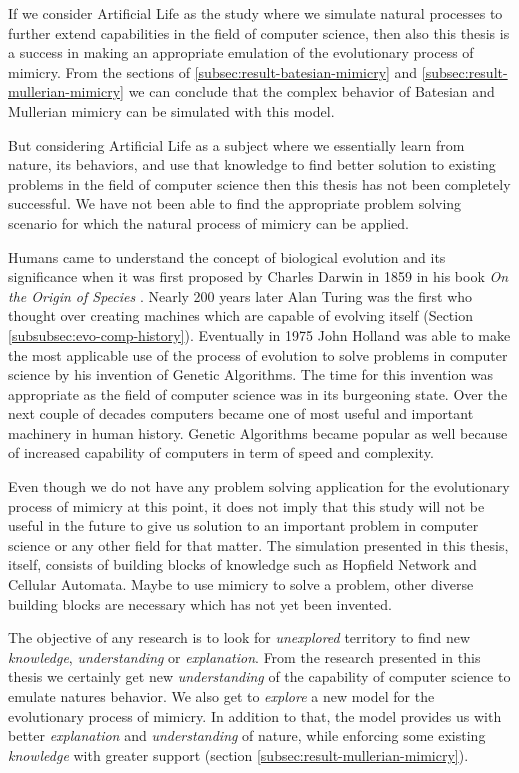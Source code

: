 \documentclass[letterpaper]{article}
\numberwithin{equation}{section}
\begin{document}
If we consider Artificial Life as the study where we simulate natural processes to further extend capabilities in the field of computer science, then also this thesis is a success in making an appropriate emulation of the evolutionary process of mimicry. From the sections of \ref{subsec:result-batesian-mimicry} and \ref{subsec:result-mullerian-mimicry} we can conclude that the complex behavior of Batesian and Mullerian mimicry can be simulated with this model.

But considering Artificial Life as a subject where we essentially learn from nature, its behaviors, and use that knowledge to find better solution to existing problems in the field of computer science then this thesis has not been completely successful. We have not been able to find the appropriate problem solving scenario for which the natural process of mimicry can be applied.

Humans came to understand the concept of biological evolution and its significance when it was first proposed by Charles Darwin in 1859 in his book \textsl{On the Origin of Species} \cite{darwin1859}. Nearly 200 years later Alan Turing was the first who thought over creating machines which are capable of evolving itself (Section \ref{subsubsec:evo-comp-history}). Eventually in 1975 John Holland was able to make the most applicable use of the process of evolution to solve problems in computer science by his invention of Genetic Algorithms. The time for this invention was appropriate as the field of computer science was in its burgeoning state. Over the next couple of decades computers became one of most useful and important machinery in human history. Genetic Algorithms became popular as well because of increased capability of computers in term of speed and complexity.  

Even though we do not have any problem solving application for the evolutionary process of mimicry at this point, it does not imply that this study will not be useful in the future to give us solution to an important problem in computer science or any other field for that matter. The simulation presented in this thesis, itself, consists of building blocks of knowledge such as Hopfield Network and Cellular Automata. Maybe to use mimicry to solve a problem, other diverse building blocks are necessary which has not yet been invented.

The objective of any research is to look for \textsl{unexplored} territory to find new \textsl{knowledge}, \textsl{understanding} or \textsl{explanation}. From the research presented in this thesis we certainly get new \textsl{understanding} of the capability of computer science to emulate natures behavior. We also get to \textsl{explore} a new model for the evolutionary process of  mimicry. In addition to that, the model provides us with better \textsl{explanation} and \textsl{understanding} of nature, while enforcing some existing \textsl{knowledge} with greater support (section \ref{subsec:result-mullerian-mimicry}). 




\printglossaries
{} \label{acronyms}
\end{document}
